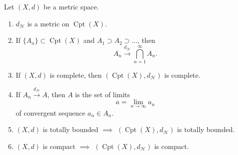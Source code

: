 \begin{theorem}\label{thm:1.3}
Let $(X,d)$ be a metric space.
\begin{enumerate}[label=(\roman*)]
    \item $d_{\mathcal{H}}$ is a metric on $\operatorname{Cpt}(X)$.
    \item \label{thm:1.3.ii} If $\{ A_{n} \}\subset \operatorname{Cpt}(X)$ and $A_{1}\supset A_{2}\supset \dots$, then \[A_{n}\xrightarrow{d_{\mathcal{H}}}\bigcap _{n=1}^{\infty}A_{n}.\]
    \item \label{thm:1.3.iii} If $(X,d)$ is complete, then $(\operatorname{Cpt}(X),d_{\mathcal{H}})$ is complete.
    \item If $A_{n}\xrightarrow{d_{\mathcal{H}}}A$, then $A$ is the set of limits \[a=\lim_{ n \to \infty }a_{n}\]of convergent sequence $a_{n}\in A_{n}$.
    \item \label{thm:1.3.v} $(X,d)$ is totally bounded $\implies$ $(\operatorname{Cpt}(X),d_{\mathcal{H}})$ is totally bounded.
    \item $(X,d)$ is compact $\implies$ $(\operatorname{Cpt}(X),d_{\mathcal{H}})$ is compact.
\end{enumerate}
\end{theorem}

